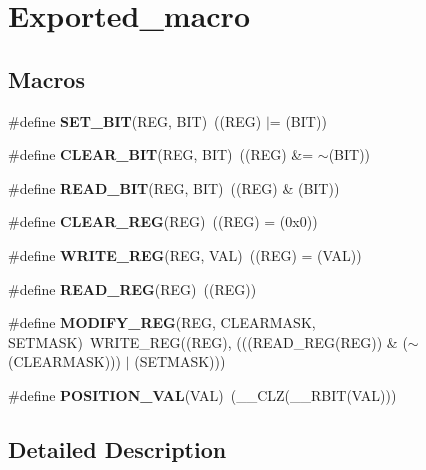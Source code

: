 \hypertarget{group___exported__macro}{}\section{Exported\+\_\+macro}
\label{group___exported__macro}
\subsection*{Macros}
\begin{DoxyCompactItemize}
\item 
\#define {\bfseries S\+E\+T\+\_\+\+B\+IT}(R\+EG,  B\+IT)~((R\+EG) $\vert$= (B\+IT))\hypertarget{group___exported__macro_ga26474f43799fbade9cf300e21dd3a91a}{}\label{group___exported__macro_ga26474f43799fbade9cf300e21dd3a91a}

\item 
\#define {\bfseries C\+L\+E\+A\+R\+\_\+\+B\+IT}(R\+EG,  B\+IT)~((R\+EG) \&= $\sim$(B\+IT))\hypertarget{group___exported__macro_ga133aae6fc0d41bffab39ab223a7001de}{}\label{group___exported__macro_ga133aae6fc0d41bffab39ab223a7001de}

\item 
\#define {\bfseries R\+E\+A\+D\+\_\+\+B\+IT}(R\+EG,  B\+IT)~((R\+EG) \& (B\+IT))\hypertarget{group___exported__macro_ga822bb1bb9710d5f2fa6396b84e583c33}{}\label{group___exported__macro_ga822bb1bb9710d5f2fa6396b84e583c33}

\item 
\#define {\bfseries C\+L\+E\+A\+R\+\_\+\+R\+EG}(R\+EG)~((R\+EG) = (0x0))\hypertarget{group___exported__macro_ga1378fbdda39f40b85420df55f41460ef}{}\label{group___exported__macro_ga1378fbdda39f40b85420df55f41460ef}

\item 
\#define {\bfseries W\+R\+I\+T\+E\+\_\+\+R\+EG}(R\+EG,  V\+AL)~((R\+EG) = (V\+AL))\hypertarget{group___exported__macro_ga32f78bffcaf6d13023dcd7f05e0c4d57}{}\label{group___exported__macro_ga32f78bffcaf6d13023dcd7f05e0c4d57}

\item 
\#define {\bfseries R\+E\+A\+D\+\_\+\+R\+EG}(R\+EG)~((R\+EG))\hypertarget{group___exported__macro_gae7f188a4d26c9e713a48414783421071}{}\label{group___exported__macro_gae7f188a4d26c9e713a48414783421071}

\item 
\#define {\bfseries M\+O\+D\+I\+F\+Y\+\_\+\+R\+EG}(R\+EG,  C\+L\+E\+A\+R\+M\+A\+SK,  S\+E\+T\+M\+A\+SK)~W\+R\+I\+T\+E\+\_\+\+R\+EG((R\+EG), (((R\+E\+A\+D\+\_\+\+R\+EG(R\+EG)) \& ($\sim$(C\+L\+E\+A\+R\+M\+A\+SK))) $\vert$ (S\+E\+T\+M\+A\+SK)))\hypertarget{group___exported__macro_ga6553c99f510c3bab8cc0a91602053247}{}\label{group___exported__macro_ga6553c99f510c3bab8cc0a91602053247}

\item 
\#define {\bfseries P\+O\+S\+I\+T\+I\+O\+N\+\_\+\+V\+AL}(V\+AL)~(\+\_\+\+\_\+\+C\+LZ(\+\_\+\+\_\+\+R\+B\+IT(V\+AL)))\hypertarget{group___exported__macro_ga47a8870d71d55cefb3df47cd8c815ec8}{}\label{group___exported__macro_ga47a8870d71d55cefb3df47cd8c815ec8}

\end{DoxyCompactItemize}


\subsection{Detailed Description}
